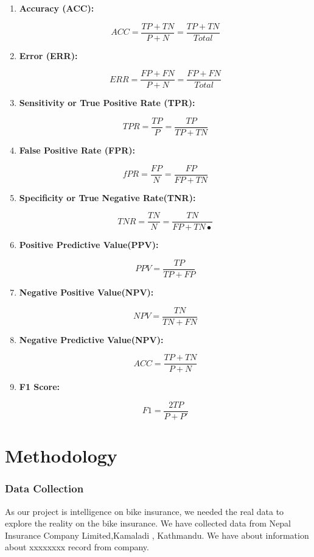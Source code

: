 \begin{enumerate}
\item \textbf{Accuracy (ACC):}
\par $$ACC = \frac{TP+TN}{P+N} =\frac{TP+TN}{Total}$$

\item \textbf{Error (ERR):}
\par $$ERR = \frac{FP+FN}{P+N} =\frac{FP+FN}{Total}$$


\item \textbf{Sensitivity or True Positive Rate (TPR):}
\par $$TPR = \frac{TP}{P}=\frac{TP}{TP+TN}$$

\item \textbf{False Positive Rate (FPR):}
\par $$fPR = \frac{FP}{N}=\frac{FP}{FP+TN}$$
\item \textbf{Specificity or True Negative Rate(TNR):}
\par $$TNR = \frac{TN}{N}=\frac{TN}{FP+TN•}$$

\item \textbf{Positive Predictive Value(PPV):}
\par $$PPV = \frac{TP}{TP+FP}$$
 
\item \textbf{Negative Positive Value(NPV):}
\par $$NPV = \frac{TN}{TN+FN}$$ 

\item \textbf{Negative Predictive Value(NPV):}
\par $$ACC = \frac{TP+TN}{P+N}$$

\item \textbf{F1 Score:}
\par $$F1=\frac{2TP}{P+P'} $$


\end{enumerate}




\chapter{Methodology}

\subsection{Data Collection}
As our project is intelligence on bike insurance, we needed the real data to explore the reality on the bike insurance. We have collected data from Nepal Insurance Company Limited,Kamaladi , Kathmandu.\cite{data2017} We have about information about xxxxxxxx record from company.
